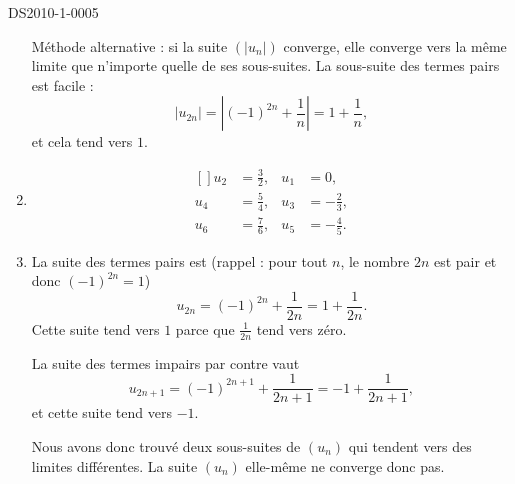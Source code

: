 \begin{corrige}{DS2010-1-0005}
\begin{enumerate}
                  Méthode alternative : si la suite $(| u_n |)$ converge, elle converge vers la même limite que n'importe quelle de ses sous-suites. La sous-suite des termes pairs est facile :
			\begin{equation}
				| u_{2n} |=\left| (-1)^{2n}+\frac{1}{ n } \right| =1+\frac{1}{ n },
			\end{equation}
			et cela tend vers $1$.
		\item
			\begin{equation}
				\begin{aligned}[]
					u_2&=\frac{ 3 }{2},	&u_1&=0,\\
					u_4&=\frac{ 5 }{4},	&u_3&=-\frac{ 2 }{ 3 },\\
					u_6&=\frac{ 7 }{6},	&u_5&=-\frac{ 4 }{ 5 }.
				\end{aligned}
			\end{equation}
		\item
			La suite des termes pairs est (rappel : pour tout $n$, le nombre $2n$ est pair et donc $(-1)^{2n}=1$)
			\begin{equation}
				u_{2n}=(-1)^{2n}+\frac{1}{ 2n }=1+\frac{1}{ 2n }.
			\end{equation}
			Cette suite tend vers $1$ parce que $\frac{1}{ 2n }$ tend vers zéro.

			La suite des termes impairs par contre vaut
			\begin{equation}
				u_{2n+1}=(-1)^{2n+1}+\frac{ 1 }{ 2n+1 }=-1+\frac{1}{ 2n+1 },
			\end{equation}
			et cette suite tend vers $-1$.

			Nous avons donc trouvé deux sous-suites de $(u_n)$ qui tendent vers des limites différentes. La suite $(u_n)$ elle-même ne converge donc pas.
	\end{enumerate}

\end{corrige}
